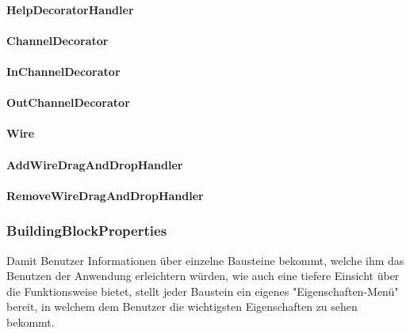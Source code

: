\documentclass[parskip=full]{scrartcl}
\begin{document}
\paragraph{HelpDecoratorHandler}

\paragraph{ChannelDecorator}

\paragraph{InChannelDecorator}

\paragraph{OutChannelDecorator}

\paragraph{Wire}

\paragraph{AddWireDragAndDropHandler}

\paragraph{RemoveWireDragAndDropHandler}


\newpage 

\subsubsection{BuildingBlockProperties}

Damit Benutzer Informationen über einzelne Bausteine bekommt, welche ihm das Benutzen der Anwendung erleichtern würden, wie auch eine tiefere Einsicht über die Funktionsweise bietet, stellt jeder Baustein ein eigenes "Eigenschaften-Menü" bereit, in welchem dem Benutzer die wichtigsten Eigenschaften zu sehen bekommt.
\end{document}
